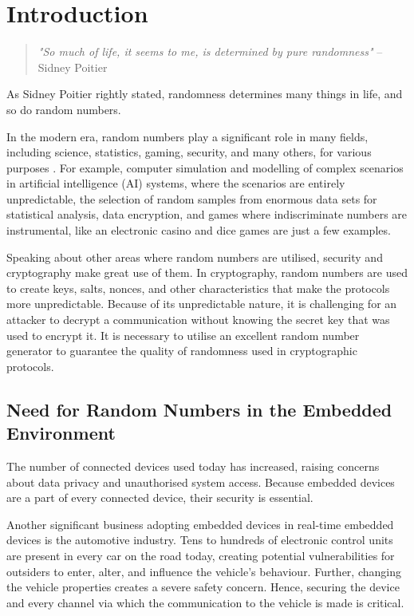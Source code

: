 \chapter{Introduction}
\label{ch:intro}

\begin{quote}
\textit{"So much of life, it seems to me, is determined by pure randomness"} –  Sidney Poitier	
\end{quote} 

As Sidney Poitier rightly stated, randomness determines many things in life, and so do random numbers.

In the modern era, random numbers play a significant role in many fields, including science, statistics, gaming, security, and many others, for various purposes \cite{RANDOM-1998}. For example, computer simulation and modelling of complex scenarios in artificial intelligence (AI) systems, where the scenarios are entirely unpredictable, the selection of random samples from enormous data sets for statistical analysis, data encryption, and games where indiscriminate numbers are instrumental, like an electronic casino and dice games \cite{RANDOM-1998} are just a few examples.

Speaking about other areas where random numbers are utilised, security and cryptography make great use of them. In cryptography, random numbers are used to create keys, salts, nonces, and other characteristics that make the protocols more unpredictable. Because of its unpredictable nature, it is challenging for an attacker to decrypt a communication without knowing the secret key that was used to encrypt it. It is necessary to utilise an excellent random number generator to guarantee the quality of randomness used in cryptographic protocols.


%
%
\section{Need for Random Numbers in the Embedded Environment}
\label{sec:intro:Need for Random Numbers in Embedded Environment}

The number of connected devices used today has increased, raising concerns about data privacy and unauthorised system access. Because embedded devices are a part of every connected device, their security is essential.

Another significant business adopting embedded devices in real-time embedded devices is the automotive industry. Tens to hundreds of electronic control units are present in every car on the road today, creating potential vulnerabilities for outsiders to enter, alter, and influence the vehicle’s behaviour. Further, changing the vehicle properties creates a severe safety concern. Hence, securing the device and every channel via which the communication to the vehicle is made is critical.


